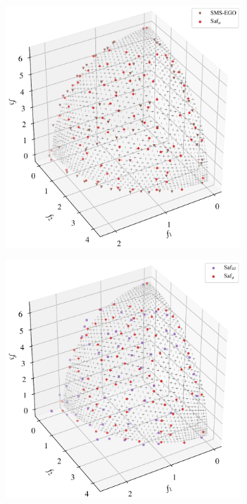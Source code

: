 \documentclass[conference]{IEEEtran}
\begin{document}
\begin{figure}[t]
\begin{subfigure}[b]{0.45\columnwidth}
         \centering
         \includegraphics[width=\columnwidth]{figures/_comparison_attainmenPoints_sms_saf.pdf}
         \caption{}
         \label{fig: exemplar_pf_sms_saf}
     \end{subfigure}
\begin{subfigure}[b]{0.45\columnwidth}
         \centering
         \includegraphics[width=\columnwidth]{figures/_comparison_attainmenPoints_safei_safmu.pdf}

\end{subfigure}
\end{figure}
\end{document}
